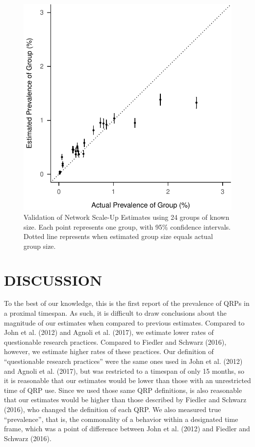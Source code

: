 \documentclass[,jou]{apa6}
\theoremstyle{definition}
\theoremstyle{definition}
\theoremstyle{definition}
\theoremstyle{remark}
\begin{document}
\begin{figure}
\centering
\includegraphics{papaja_output_files/figure-latex/unnamed-chunk-14-1.pdf}
\caption{\label{fig:unnamed-chunk-14}\label{fig:fig2}Validation of Network
Scale-Up Estimates using 24 groups of known size. Each point represents
one group, with 95\% confidence intervals. Dotted line represents when
estimated group size equals actual group size.}
\end{figure}

\section{DISCUSSION}\label{discussion}

To the best of our knowledge, this is the first report of the prevalence
of QRPs in a proximal timespan. As such, it is difficult to draw
conclusions about the magnitude of our estimates when compared to
previous estimates. Compared to John et al. (2012) and Agnoli et al.
(2017), we estimate lower rates of questionable research practices.
Compared to Fiedler and Schwarz (2016), however, we estimate higher
rates of these practices. Our definition of \enquote{questionable
research practices} were the same ones used in John et al. (2012) and
Agnoli et al. (2017), but was restricted to a timespan of only 15
months, so it is reasonable that our estimates would be lower than those
with an unrestricted time of QRP use. Since we used those same QRP
definitions, is also reasonable that our estimates would be higher than
those described by Fiedler and Schwarz (2016), who changed the
definition of each QRP. We also measured true \enquote{prevalence}, that
is, the commonality of a behavior within a designated time frame, which
was a point of difference between John et al. (2012) and Fiedler and
Schwarz (2016).
\end{document}
